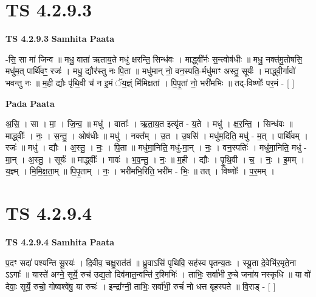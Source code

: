 \documentclass[17pt]{extarticle}
\begin{document}

\section{ TS 4.2.9.3 }

\textbf{TS 4.2.9.3 } \newline
\textbf{Samhita Paata} \newline

-सि॒ सा मा॑ जिन्व ॥ मधु॒ वाता॑ ऋताय॒ते मधु॑ क्षरन्ति॒ सिन्ध॑वः । माद्ध्वी᳚र्नः स॒न्त्वोष॑धीः ॥ मधु॒ नक्त॑मु॒तोषसि॒ मधु॑म॒त् पार्थि॑वꣳ॒॒ रजः॑ । मधु॒ द्यौर॑स्तु नः पि॒ता ॥ मधु॑मान् नो॒ वन॒स्पति॒-र्मधु॑माꣳ अस्तु॒ सूर्यः॑ । माद्ध्वी॒र्गावो॑ भवन्तु नः ॥ म॒ही द्यौः पृ॑थि॒वी च॑ न इ॒मं ॅय॒ज्ञ्ं मि॑मिक्षतां । पि॒पृ॒तां नो॒ भरी॑मभिः ॥ तद्-विष्णोः᳚ पर॒मं - [  ] \newline

\textbf{Pada Paata} \newline

अ॒सि॒ । सा । मा॒ । जि॒न्व॒ ॥ मधु॑ । वाताः᳚ । ऋ॒ता॒य॒त इत्यृ॑त - य॒ते । मधु॑ । क्ष॒र॒न्ति॒ । सिन्ध॑वः ॥ माद्ध्वीः᳚ । नः॒ । स॒न्तु॒ । ओष॑धीः ॥ मधु॑ । नक्त᳚म् । उ॒त । उ॒षसि॑ । मधु॑म॒दिति॒ मधु॑ - म॒त् । पार्थि॑वम् । रजः॑ ॥ मधु॑ । द्यौः । अ॒स्तु॒ । नः॒ । पि॒ता ॥ मधु॑मा॒निति॒ मधु॑-मा॒न् । नः॒ । वन॒स्पतिः॑ । मधु॑मा॒निति॒ मधु॑ - मा॒न् । अ॒स्तु॒ । सूर्यः॑ ॥ माद्ध्वीः᳚ । गावः॑ । भ॒व॒न्तु॒ । नः॒ ॥ म॒ही । द्यौः । पृ॒थि॒वी । च॒ । नः॒ । इ॒मम् । य॒ज्ञ्म् । मि॒मि॒क्ष॒ता॒म् ॥ पि॒पृ॒ताम् । नः॒ । भरी॑मभि॒रिति॒ भरी॑म - भिः॒ ॥ तत् । विष्णोः᳚ । प॒र॒मम् ।  \newline





\section{ TS 4.2.9.4 }

\textbf{TS 4.2.9.4 } \newline
\textbf{Samhita Paata} \newline

प॒दꣳ सदा॑ पश्यन्ति सू॒रयः॑ । दि॒वीव॒ चक्षु॒रात॑तं ॥ ध्रु॒वाऽसि॑ पृथिवि॒ सह॑स्व पृतन्य॒तः । स्यू॒ता दे॒वेभि॑र॒मृते॒ना ऽऽगाः᳚ ॥ यास्ते॑ अग्ने॒ सूर्ये॒ रुच॑ उद्य॒तो दिव॑मात॒न्वन्ति॑ र॒श्मिभिः॑ । ताभिः॒ सर्वा॑भी रु॒चे जना॑य नस्कृधि ॥ या वो॑ देवाः॒ सूर्ये॒ रुचो॒ गोष्वश्वे॑षु॒ या रुचः॑ । इन्द्रा᳚ग्नी॒ ताभिः॒ सर्वा॑भी॒ रुचं॑ नो धत्त बृहस्पते ॥ वि॒राड् - [  ] \newline
\end{document}
